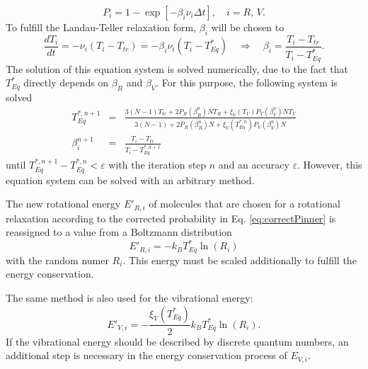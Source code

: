 \documentclass[aip,pof,amsmath,amssymb,preprint]{revtex4-1}
\begin{document}
\begin{equation}
P_i=1-\exp\left[-\beta_i\nu_i \Delta t\right],\quad i=R,\,V.
\label{eq:correctPinner}
\end{equation}
To fulfill the Landau-Teller relaxation form, $\beta_i$ will be chosen to
\begin{equation}
\frac{d T_i}{dt}=-\nu_i(T_i-T_{tr})=-\beta_i\nu_i(T_i-T^*_{Eq})\quad \Rightarrow \quad \beta_i = \frac{T_i-T_{tr}}{T_i-T^*_{Eq}}.
\end{equation}
The solution of this equation system is solved numerically, due to the fact that $T^*_{Eq}$ directly depends on $\beta_R$ and $\beta_V$.
For this purpose, the following system is solved 
\begin{eqnarray}
T^{*,n+1}_{Eq}&=&\frac{3(N-1)T_{tr}+2P_R(\beta_R^{n})NT_R+\xi_V(T_V)P_V(\beta_V^{n})NT_V}{3(N-1)+2P_R(\beta_R^{n})N+\xi_V(T^{*,n}_{Eq})P_V(\beta_V^{n})N} \label{eq:tequinum}\\
\beta_i^{n+1} &=& \frac{T_i-T_{tr}}{T_i-T^{*,n+1}_{Eq}}
\end{eqnarray}
until $T^{*,n+1}_{Eq}-T^{*,n}_{Eq}<\varepsilon$ with the iteration step $n$ and an accuracy $\varepsilon$. However, this equation system can be solved with 
an arbitrary method.

The new rotational energy $E'_{R,i}$ of molecules that are chosen for a rotational relaxation according to the corrected probability in Eq. \eqref{eq:correctPinner}
is reassigned to a value from a Boltzmann distribution
\begin{equation}
E'_{R,i}=-k_B T^*_{Eq} \ln(R_i)
\end{equation}
with the random numer $R_i$. This energy must be scaled additionally to fulfill the energy conservation.

The same method is also used for the vibrational energy:
\begin{equation}
E'_{V,i}=-\frac{\xi_V(T^*_{Eq})}{2}k_B T^*_{Eq} \ln(R_i).
\end{equation}
If the vibrational energy should be described by discrete quantum numbers, an additional step is necessary in the energy conservation process of $E_{V,i}$.
\end{document}
